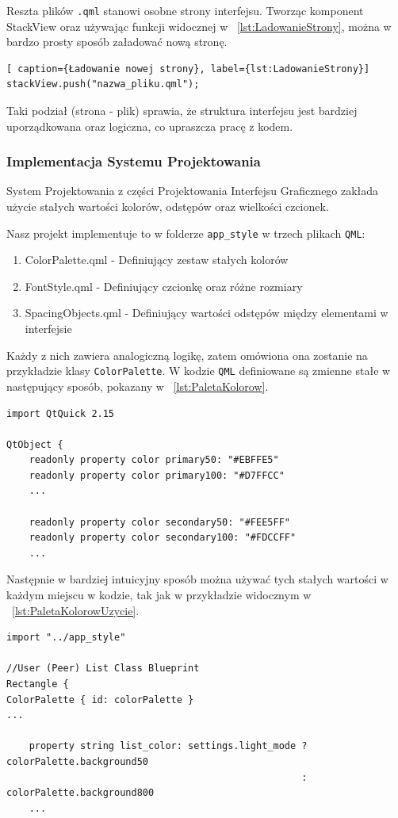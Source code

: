 Reszta plików \texttt{.qml} stanowi osobne strony interfejsu. 
Tworząc komponent StackView oraz używając funkcji widocznej w \lstlistingname{~\ref{lst:LadowanieStrony}}, można w bardzo prosty sposób załadować nową stronę.
\begin{lstlisting}[ caption={Ładowanie nowej strony}, label={lst:LadowanieStrony}]
stackView.push("nazwa_pliku.qml");
\end{lstlisting}
Taki podział (strona - plik) sprawia, że struktura interfejsu jest bardziej
uporządkowana oraz logiczna, co upraszcza pracę z kodem.

\subsubsection{Implementacja Systemu Projektowania}
\label{sec:ImplementacjaSystemuProjektowania}
System Projektowania z części Projektowania Interfejsu Graficznego zakłada użycie stałych wartości kolorów, odstępów oraz wielkości czcionek.

Nasz projekt implementuje to w folderze \texttt{app\_style} w trzech plikach \texttt{QML}:

\begin{enumerate}
    \item ColorPalette.qml - Definiujący zestaw stałych kolorów
    \item FontStyle.qml - Definiujący czcionkę oraz różne rozmiary
    \item SpacingObjects.qml - Definiujący wartości odstępów między elementami w interfejsie
\end{enumerate}

Każdy z nich zawiera analogiczną logikę, zatem omówiona ona zostanie na przykładzie klasy \texttt{ColorPalette}. W kodzie \texttt{QML} definiowane są zmienne stałe w następujący sposób, pokazany w \lstlistingname{~\ref{lst:PaletaKolorow}}.

\begin{lstlisting}[caption={ColorPalette.qml}, label={lst:PaletaKolorow}]
import QtQuick 2.15

QtObject {
    readonly property color primary50: "#EBFFE5"
    readonly property color primary100: "#D7FFCC"
    ...

    readonly property color secondary50: "#FEE5FF"
    readonly property color secondary100: "#FDCCFF"
    ...
\end{lstlisting}

Następnie w bardziej intuicyjny sposób można używać tych stałych wartości w każdym miejscu w kodzie, tak jak w przykładzie widocznym w \lstlistingname{~\ref{lst:PaletaKolorowUzycie}}.
\begin{lstlisting}[caption={Przykładowe użycie palety kolorów}, label={lst:PaletaKolorowUzycie}]
import "../app_style"

//User (Peer) List Class Blueprint
Rectangle {
ColorPalette { id: colorPalette }
...

    property string list_color: settings.light_mode ? colorPalette.background50
                                                    : colorPalette.background800
    ...
\end{lstlisting}  

